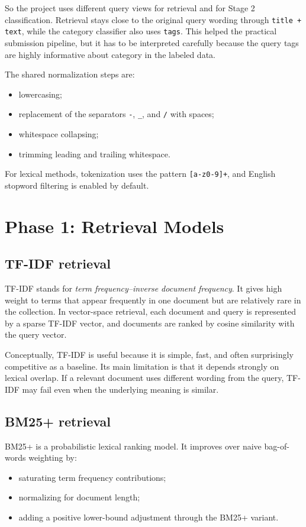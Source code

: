 \documentclass[11pt,a4paper]{article}
\begin{document}
So the project uses different query views for retrieval and for Stage 2 classification. Retrieval stays close to the original query wording through \texttt{title + text}, while the category classifier also uses \texttt{tags}. This helped the practical submission pipeline, but it has to be interpreted carefully because the query tags are highly informative about category in the labeled data.

The shared normalization steps are:
\begin{itemize}
    \item lowercasing;
    \item replacement of the separators \texttt{-}, \texttt{\_}, and \texttt{/} with spaces;
    \item whitespace collapsing;
    \item trimming leading and trailing whitespace.
\end{itemize}

For lexical methods, tokenization uses the pattern \texttt{[a-z0-9]+}, and English stopword filtering is enabled by default.

\section{Phase 1: Retrieval Models}

\subsection{TF-IDF retrieval}

TF-IDF stands for \emph{term frequency--inverse document frequency}. It gives high weight to terms that appear frequently in one document but are relatively rare in the collection. In vector-space retrieval, each document and query is represented by a sparse TF-IDF vector, and documents are ranked by cosine similarity with the query vector.

Conceptually, TF-IDF is useful because it is simple, fast, and often surprisingly competitive as a baseline. Its main limitation is that it depends strongly on lexical overlap. If a relevant document uses different wording from the query, TF-IDF may fail even when the underlying meaning is similar.

\subsection{BM25+ retrieval}

BM25+ is a probabilistic lexical ranking model. It improves over naive bag-of-words weighting by:
\begin{itemize}
    \item saturating term frequency contributions;
    \item normalizing for document length;
    \item adding a positive lower-bound adjustment through the BM25+ variant.
\end{itemize}
\end{document}
